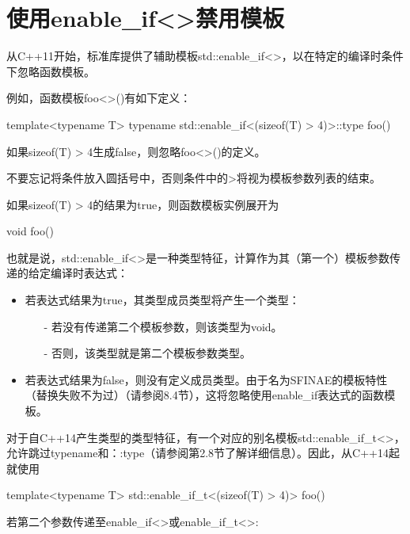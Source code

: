 \section{使用enable\_if<>禁用模板}
从C++11开始，标准库提供了辅助模板std::enable\_if<>，以在特定的编译时条件下忽略函数模板。

例如，函数模板foo<>()有如下定义：

\begin{cpp}
template<typename T>
typename std::enable_if<(sizeof(T) > 4)>::type
foo() {
}
\end{cpp}

如果sizeof(T) > 4生成false，则忽略foo<>()的定义。

\begin{notice}
不要忘记将条件放入圆括号中，否则条件中的>将视为模板参数列表的结束。
\end{notice}

如果sizeof(T) > 4的结果为true，则函数模板实例展开为

\begin{cpp}
void foo() {
}
\end{cpp}

也就是说，std::enable\_if<>是一种类型特征，计算作为其（第一个）模板参数传递的给定编译时表达式：

\begin{itemize}
\item 
若表达式结果为true，其类型成员类型将产生一个类型：

\begin{itemize}
\item[-]
若没有传递第二个模板参数，则该类型为void。
	
\item[-]
否则，该类型就是第二个模板参数类型。
\end{itemize}

\item 
若表达式结果为false，则没有定义成员类型。由于名为SFINAE的模板特性（替换失败不为过）（请参阅8.4节），这将忽略使用enable\_if表达式的函数模板。
\end{itemize}

对于自C++14产生类型的类型特征，有一个对应的别名模板std::enable\_if\_t<>，允许跳过typename和：:type（请参阅第2.8节了解详细信息）。因此，从C++14起就使用

\begin{cpp}
template<typename T>
std::enable_if_t<(sizeof(T) > 4)>
foo() {
}
\end{cpp}

若第二个参数传递至enable\_if<>或enable\_if\_t<>:

